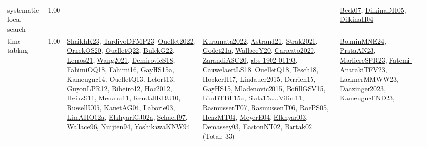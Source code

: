 {\begin{longtable}{p{3cm}r>{\raggedright\arraybackslash}p{6cm}>{\raggedright\arraybackslash}p{6cm}>{\raggedright\arraybackslash}p{8cm}}
\index{systematic local search}\index{Algorithms!systematic local search}systematic local search &  1.00 &  &  & \hyperref[detail:Beck07]{Beck07}, \hyperref[detail:DilkinaDH05]{DilkinaDH05}, \hyperref[detail:DilkinaH04]{DilkinaH04}\\
\index{time-tabling}\index{Algorithms!time-tabling}time-tabling &  1.00 & \hyperref[detail:ShaikhK23]{ShaikhK23}, \hyperref[detail:TardivoDFMP23]{TardivoDFMP23}, \hyperref[detail:Ouellet2022]{Ouellet2022}, \hyperref[detail:OrnekOS20]{OrnekOS20}, \hyperref[detail:OuelletQ22]{OuelletQ22}, \hyperref[detail:BulckG22]{BulckG22}, \hyperref[detail:Lemos21]{Lemos21}, \hyperref[detail:Wang2021]{Wang2021}, \hyperref[detail:DemirovicS18]{DemirovicS18}, \hyperref[detail:FahimiOQ18]{FahimiOQ18}, \hyperref[detail:Fahimi16]{Fahimi16}, \hyperref[detail:GayHS15a]{GayHS15a}, \hyperref[detail:Kameugne14]{Kameugne14}, \hyperref[detail:OuelletQ13]{OuelletQ13}, \hyperref[detail:Letort13]{Letort13}, \hyperref[detail:GuyonLPR12]{GuyonLPR12}, \hyperref[detail:Ribeiro12]{Ribeiro12}, \hyperref[detail:Hoc2012]{Hoc2012}, \hyperref[detail:HeinzS11]{HeinzS11}, \hyperref[detail:Menana11]{Menana11}, \hyperref[detail:KendallKRU10]{KendallKRU10}, \hyperref[detail:RussellU06]{RussellU06}, \hyperref[detail:KanetAG04]{KanetAG04}, \hyperref[detail:Laborie03]{Laborie03}, \hyperref[detail:LimAHO02a]{LimAHO02a}, \hyperref[detail:ElkhyariGJ02a]{ElkhyariGJ02a}, \hyperref[detail:Schaerf97]{Schaerf97}, \hyperref[detail:Wallace96]{Wallace96}, \hyperref[detail:Nuijten94]{Nuijten94}, \hyperref[detail:YoshikawaKNW94]{YoshikawaKNW94} & \hyperref[detail:Kuramata2022]{Kuramata2022}, \hyperref[detail:Astrand21]{Astrand21}, \hyperref[detail:Strak2021]{Strak2021}, \hyperref[detail:Godet21a]{Godet21a}, \hyperref[detail:WallaceY20]{WallaceY20}, \hyperref[detail:Caricato2020]{Caricato2020}, \hyperref[detail:ZarandiASC20]{ZarandiASC20}, \hyperref[detail:abs-1902-01193]{abs-1902-01193}, \hyperref[detail:CauwelaertLS18]{CauwelaertLS18}, \hyperref[detail:OuelletQ18]{OuelletQ18}, \hyperref[detail:Tesch18]{Tesch18}, \hyperref[detail:HookerH17]{HookerH17}, \hyperref[detail:Lindauer2015]{Lindauer2015}, \hyperref[detail:Derrien15]{Derrien15}, \hyperref[detail:GayHS15]{GayHS15}, \hyperref[detail:Mladenovic2015]{Mladenovic2015}, \hyperref[detail:BofillGSV15]{BofillGSV15}, \hyperref[detail:LimBTBB15a]{LimBTBB15a}, \hyperref[detail:Siala15a]{Siala15a}...\hyperref[detail:Vilim11]{Vilim11}, \hyperref[detail:RasmussenT07]{RasmussenT07}, \hyperref[detail:RasmussenT06]{RasmussenT06}, \hyperref[detail:RoePS05]{RoePS05}, \hyperref[detail:HenzMT04]{HenzMT04}, \hyperref[detail:MeyerE04]{MeyerE04}, \hyperref[detail:Elkhyari03]{Elkhyari03}, \hyperref[detail:Demassey03]{Demassey03}, \hyperref[detail:EastonNT02]{EastonNT02}, \hyperref[detail:Bartak02]{Bartak02} (Total: 33) & \hyperref[detail:BonninMNE24]{BonninMNE24}, \hyperref[detail:PrataAN23]{PrataAN23}, \hyperref[detail:MarliereSPR23]{MarliereSPR23}, \hyperref[detail:Fatemi-AnarakiTFV23]{Fatemi-AnarakiTFV23}, \hyperref[detail:LacknerMMWW23]{LacknerMMWW23}, \hyperref[detail:Danzinger2023]{Danzinger2023}, \hyperref[detail:KameugneFND23]{KameugneFND23}, 
\end{longtable}}
